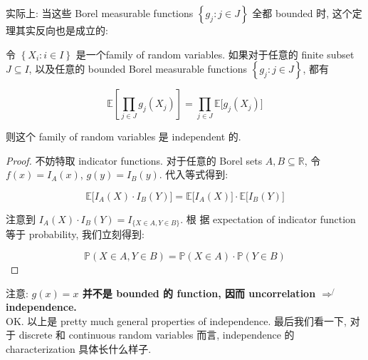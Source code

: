 实际上: 当这些 Borel measurable functions \(\left\{ {\mathit{g}_{\mathit{j}}:\mathit{j} \in \mathit{J}} \right\}\) 全都 bounded 时, 这个定理其实反向也是成立的:

\begin{theorem}

令 \(\left\{ {\mathit{X}_{\mathit{i}}:\mathit{i} \in \mathit{I}} \right\}\) 是一个family of random variables. 如果对于任意的 finite subset \(\mathit{J} \subseteq \mathit{I}\), 以及任意的 bounded Borel measurable functions \(\left\{ {\mathit{g}_{\mathit{j}}:\mathit{j} \in \mathit{J}} \right\}\), 都有

\[\mathbb{E}\left\lbrack {\prod\limits_{\mathit{j} \in \mathit{J}}\mathit{g}_{\mathit{j}}(\mathit{X}_{\mathit{j}})} \right\rbrack = \prod\limits_{\mathit{j} \in \mathit{J}}\mathbb{E}\lbrack\mathit{g}_{\mathit{j}}(\mathit{X}_{\mathit{j}})\rbrack\]

则这个 family of random variables 是 independent 的.

\end{theorem}

\begin{proof}

不妨特取 indicator functions. 对于任意的 Borel sets \(\mathit{A},\mathit{B} \subseteq \mathbb{R}\), 令 \(\mathit{f}(\mathit{x}) = \mathit{I}_{\mathit{A}}(\mathit{x})\), \(\mathit{g}(\mathit{y}) = \mathit{I}_{\mathit{B}}(\mathit{y})\). 代入等式得到:

\[\mathbb{E}\lbrack\mathit{I}_{\mathit{A}}(\mathit{X}) \cdot \mathit{I}_{\mathit{B}}(\mathit{Y})\rbrack = \mathbb{E}\lbrack\mathit{I}_{\mathit{A}}(\mathit{X})\rbrack \cdot \mathbb{E}\lbrack\mathit{I}_{\mathit{B}}(\mathit{Y})\rbrack\]

注意到 \(\mathit{I}_{\mathit{A}}(\mathit{X}) \cdot \mathit{I}_{\mathit{B}}(\mathit{Y}) = \mathit{I}_{\{{\mathit{X} \in \mathit{A},\mathit{Y} \in \mathit{B}}\}}\). 根 据 expectation of indicator function 等于 probability, 我们立刻得到:

\[\mathbb{P}(\mathit{X} \in \mathit{A},\mathit{Y} \in \mathit{B}) = \mathbb{P}(\mathit{X} \in \mathit{A}) \cdot \mathbb{P}(\mathit{Y} \in \mathit{B})\]

\end{proof}

注意: \textbf{\(\mathit{g}(\mathit{x}) = \mathit{x}\) 并不是 bounded 的 function, 因而 uncorrelation \(\operatorname{\Longrightarrow\not{}}\) independence.}\\
OK. 以上是 pretty much general properties of independence. 最后我们看一下, 对于 discrete 和 continuous random variables 而言, independence 的 characterization 具体长什么样子.


